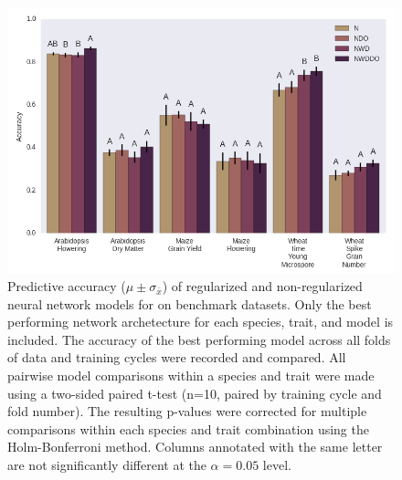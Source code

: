 
\begin{figure}[htbp]
\renewcommand{\familydefault}{\sfdefault}\normalfont
\centering 
\includegraphics[width=\linewidth]{g3_article/figures/network_comparison.png}
    \caption{Predictive accuracy ($\mu \pm \sigma_{\bar{x}}$) of 
             regularized and non-regularized 
             neural network models for on benchmark datasets. Only the best performing
             network archetecture for each species, trait, and model is included. 
             The accuracy of the best performing model across all folds of data 
             and training cycles were recorded and compared. All pairwise model 
             comparisons within a species and trait were made using a two-sided paired t-test 
             (n=10, paired by training cycle and fold number).
             The resulting p-values were corrected for multiple comparisons within each 
             species and trait combination using the Holm-Bonferroni method. Columns annotated 
             with the same letter are not significantly different 
             at the $\alpha=0.05$ level.}
\label{fig:network-comparison}
\end{figure}
